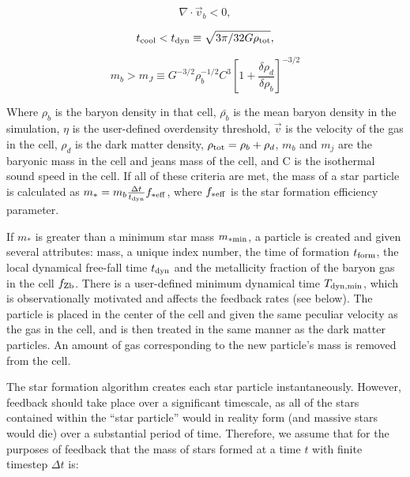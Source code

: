 \begin{equation}
\nabla \cdot \vec{v}_b < 0,
\label{cencont}
\end{equation}

\begin{equation}
t_{\rm cool} < t_{\rm dyn} \equiv \sqrt{3 \pi / 32G \rho_{\rm tot}},
\end{equation}

\begin{equation}
m_{b} > m_{J} \equiv G^{-3/2} \rho_{b}^{-1/2}C^{3}
\left[ 1 + \frac{\delta\rho_{d}}{\delta\rho_{b}} \right]^{-3/2}
\end{equation}

Where $\rho_b$ is the baryon density in that cell, $\bar{\rho_b}$ is
the mean baryon density in the simulation, $\eta$ is the user-defined
overdensity threshold, $\vec{v}$ is the velocity of the gas in the
cell, $\rho_{d}$ is the dark matter density, $\rho_{\rm tot} =
\rho_{b} + \rho_{d}$, $m_{b}$ and $m_{j}$ are the baryonic mass in the
cell and jeans mass of the cell, and C is the isothermal sound speed
in the cell.  If all of these criteria are met, the mass of a star
particle is calculated as \(m_{*} = m_{b} \frac{ \Delta t}{ t_{\rm
    dyn} } f_{\rm *eff} \), where $f_{\rm *eff}$ is the star formation
efficiency parameter.

If $m_{*}$ is greater than a minimum star mass $m_{\rm *min}$, a particle
is created and given several attributes: mass, a unique index number,
the time of formation $t_{\rm form}$, the local dynamical free-fall time
$t_{\rm dyn}$ and the metallicity fraction of the baryon gas in the cell
$f_{\rm Zb}$.  There is a user-defined minimum dynamical time
$T_{\rm dyn,min}$, which is observationally motivated and affects the
feedback rates (see below).  The particle is placed in the center of
the cell and given the same peculiar velocity as the gas in the cell,
and is then treated in the same manner as the dark matter particles.
An amount of gas corresponding to the new particle's mass is
removed from the cell.



The star formation algorithm creates each star particle
instantaneously.  However, feedback should take place over a
significant timescale, as all of the stars contained within the ``star
particle'' would in reality form (and massive stars would die) over a
substantial period of time.  Therefore, we assume that for the
purposes of feedback that the mass of stars formed at a time $t$ with
finite timestep $\Delta t$ is:

